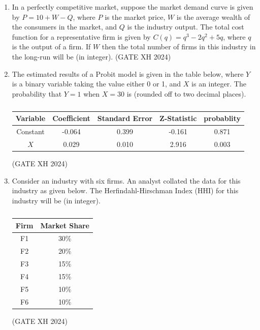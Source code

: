 \documentclass{article}
\begin{document}
\begin{enumerate}
    \item In a perfectly competitive market, suppose the market demand curve is given by $P=10+W-Q$, where $P$ is the market price, $W$ is the average wealth of the consumers in the market, and $Q$ is the industry output. The total cost function for a representative firm is given by $C(q)=q^3-2q^2+5q$, where $q$ is the output of a firm. If $W$ then the total number of firms in this industry in the long-run will be \makebox[1cm]{\hrulefill} (in integer).  \hfill (GATE XH 2024)

    \item The estimated results of a Probit model is given in the table below, where $Y$ is a binary variable taking the value either 0 or 1, and $X$ is an integer. The probability that $Y=1$ when $X=30$ is \makebox[1cm]{\hrulefill} (rounded off to two decimal places). 

    \begin{table}[h]
        \centering
        \begin{tabular}{|c|c|c|c|c|}
        \hline
         Variable & Coefficient & Standard Error & Z-Statistic & probablity \\ \hline
         Constant & -0.064      & 0.399          & -0.161      & 0.871      \\ \hline
         $X$      & 0.029       & 0.010          & 2.916       & 0.003      \\ \hline
        \end{tabular}
        \caption{}
    \end{table} \hfill (GATE XH 2024)

    \item Consider an industry with six firms. An analyst collated the data for this industry as given below. The Herfindahl-Hirschman Index (HHI) for this industry will be \makebox[1cm]{\hrulefill} (in integer).

    \begin{table}[h]
        \centering
        \begin{tabular}{|c|c|}
        \hline
         Firm & Market Share \\ \hline
         F1   & 30\%         \\ \hline
         F2   & 20\%         \\ \hline
         F3   & 15\%         \\ \hline
         F4   & 15\%         \\ \hline
         F5   & 10\%         \\ \hline
         F6   & 10\%         \\ \hline
        \end{tabular}
        \caption{}
    \end{table} \hfill (GATE XH 2024)


\end{enumerate}
\end{document}
